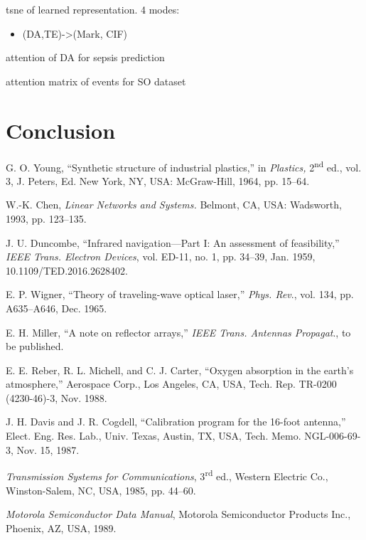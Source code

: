 \documentclass[journal,twoside,web]{ieeecolor}
\begin{document}
tsne of learned representation. 4 modes:


\begin{itemize}
    \item (DA,TE)->(Mark, CIF)
\end{itemize}

attention of DA for sepsis prediction

attention matrix of events for SO dataset

\section{Conclusion}
\label{sec:Conclusion}








\begin{thebibliography}{00}

 G. O. Young, ``Synthetic structure of industrial plastics,'' in \emph{Plastics,} 2\textsuperscript{nd} ed., vol. 3, J. Peters, Ed. New York, NY, USA: McGraw-Hill, 1964, pp. 15--64.

 W.-K. Chen, \emph{Linear Networks and Systems.} Belmont, CA, USA: Wadsworth, 1993, pp. 123--135.

 J. U. Duncombe, ``Infrared navigation---Part I: An assessment of feasibility,'' \emph{IEEE Trans. Electron Devices}, vol. ED-11, no. 1, pp. 34--39, Jan. 1959, 10.1109/TED.2016.2628402.

 E. P. Wigner, ``Theory of traveling-wave optical laser,'' \emph{Phys. Rev}., vol. 134, pp. A635--A646, Dec. 1965.

 E. H. Miller, ``A note on reflector arrays,'' \emph{IEEE Trans. Antennas Propagat}., to be published.

 E. E. Reber, R. L. Michell, and C. J. Carter, ``Oxygen absorption in the earth's atmosphere,'' Aerospace Corp., Los Angeles, CA, USA, Tech. Rep. TR-0200 (4230-46)-3, Nov. 1988.

 J. H. Davis and J. R. Cogdell, ``Calibration program for the 16-foot antenna,'' Elect. Eng. Res. Lab., Univ. Texas, Austin, TX, USA, Tech. Memo. NGL-006-69-3, Nov. 15, 1987.

 \emph{Transmission Systems for Communications}, 3\textsuperscript{rd} ed., Western Electric Co., Winston-Salem, NC, USA, 1985, pp. 44--60.

 \emph{Motorola Semiconductor Data Manual}, Motorola Semiconductor Products Inc., Phoenix, AZ, USA, 1989.


\end{thebibliography}
\end{document}
